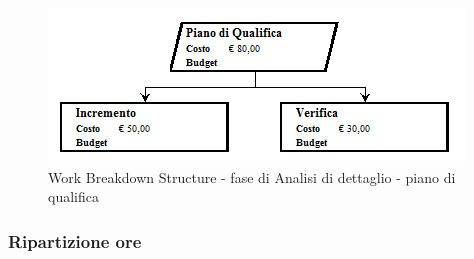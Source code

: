 \documentclass[a4paper]{article}
\begin{document}
				\begin{figure}[H]
					\centering
					\includegraphics[width=\textwidth]{wbs/wbs_dettaglio_5}
					\caption{Work Breakdown Structure - fase di Analisi di dettaglio - piano di qualifica}
				\end{figure}
			\subsubsection{Ripartizione ore}
\end{document}
